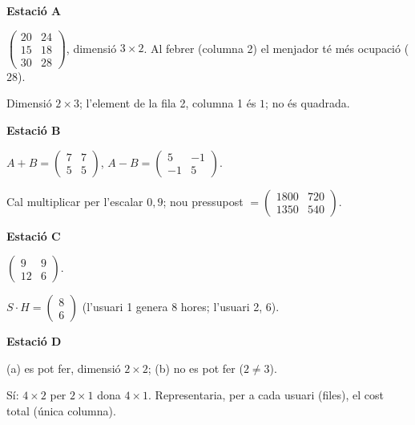 \begin{solucions}
\textbf{Estació A}
\begin{sollist}
  \item $\begin{pmatrix} 20 & 24 \\ 15 & 18 \\ 30 & 28 \end{pmatrix}$,
        \;dimensió $3\times 2$. Al febrer (columna 2) el menjador té més ocupació
        ($28$).
  \item Dimensió $2\times 3$; \;l'element de la fila 2, columna 1 és $1$; \;no és
        quadrada.
\end{sollist}

\textbf{Estació B}
\begin{sollist}
  \item $A+B=\begin{pmatrix} 7 & 7 \\ 5 & 5 \end{pmatrix}$,
        \;$A-B=\begin{pmatrix} 5 & -1 \\ -1 & 5 \end{pmatrix}$.
  \item Cal multiplicar per l'escalar $0{,}9$;
        \;nou pressupost $=\begin{pmatrix} 1800 & 720 \\ 1350 & 540 \end{pmatrix}$.
\end{sollist}

\textbf{Estació C}
\begin{sollist}
  \item $\begin{pmatrix} 9 & 9 \\ 12 & 6 \end{pmatrix}$.
  \item $S\cdot H=\begin{pmatrix} 8 \\ 6 \end{pmatrix}$
        (l'usuari 1 genera $8$ hores; l'usuari 2, $6$).
\end{sollist}

\textbf{Estació D}
\begin{sollist}
  \item (a) es pot fer, dimensió $2\times 2$; \;(b) no es pot fer ($2\neq 3$).
  \item Sí: $4\times 2$ per $2\times 1$ dona $4\times 1$. Representaria, per a cada
        usuari (files), el cost total (única columna).
\end{sollist}
\end{solucions}
